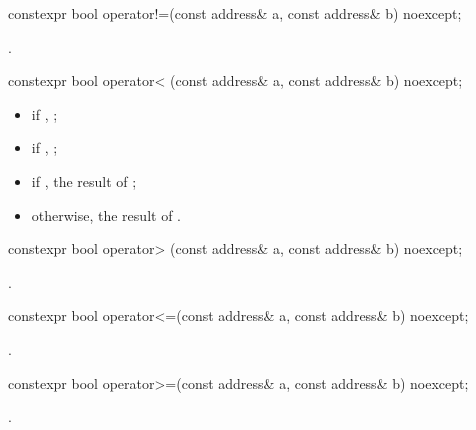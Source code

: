 %
\begin{itemdecl}
constexpr bool operator!=(const address& a, const address& b) noexcept;
\end{itemdecl}

\begin{itemdescr}
\pnum
\returns {}.
\end{itemdescr}

%
\begin{itemdecl}
constexpr bool operator< (const address& a, const address& b) noexcept;
\end{itemdecl}

\begin{itemdescr}
\pnum
\returns 
\begin{itemize}
\item
 if , ;
\item
 if , ;
\item
 if , the result of ;
\item
 otherwise, the result of .
\end{itemize}
\end{itemdescr}

%
\begin{itemdecl}
constexpr bool operator> (const address& a, const address& b) noexcept;
\end{itemdecl}

\begin{itemdescr}
\pnum
\returns {}.
\end{itemdescr}

%
\begin{itemdecl}
constexpr bool operator<=(const address& a, const address& b) noexcept;
\end{itemdecl}

\begin{itemdescr}
\pnum
\returns {}.
\end{itemdescr}

%
\begin{itemdecl}
constexpr bool operator>=(const address& a, const address& b) noexcept;
\end{itemdecl}

\begin{itemdescr}
\pnum
\returns {}.
\end{itemdescr}



